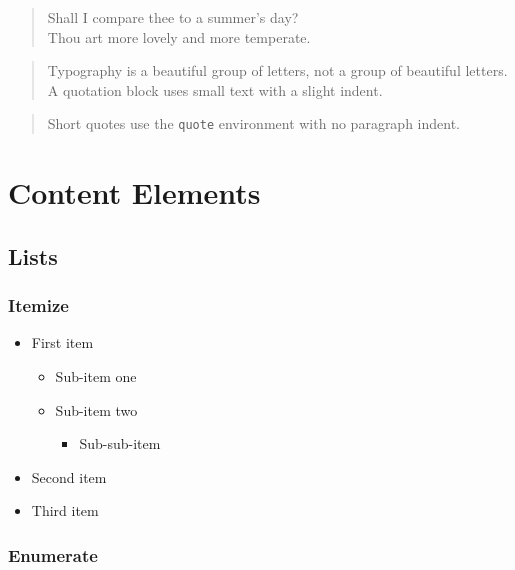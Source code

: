 \documentclass[sans,oneside,numeric,raggedright,fullwidth]{qbook}
\begin{document}
\begin{verse}
  Shall I compare thee to a summer's day?\\
  Thou art more lovely and more temperate.
\end{verse}

\begin{quotation}
  Typography is a beautiful group of letters, not a group of beautiful
  letters.  A quotation block uses small text with a slight indent.
  \lipsum[9]
\end{quotation}

\begin{quote}
  Short quotes use the \texttt{quote} environment with no paragraph indent.
\end{quote}

\chapter{Content Elements}\label{ch:content}

\section{Lists}

\subsection{Itemize}

\begin{itemize}
  \item First item
    \begin{itemize}
      \item Sub-item one
      \item Sub-item two
        \begin{itemize}
          \item Sub-sub-item
        \end{itemize}
    \end{itemize}
  \item Second item
  \item Third item
\end{itemize}

\subsection{Enumerate}
\end{document}
